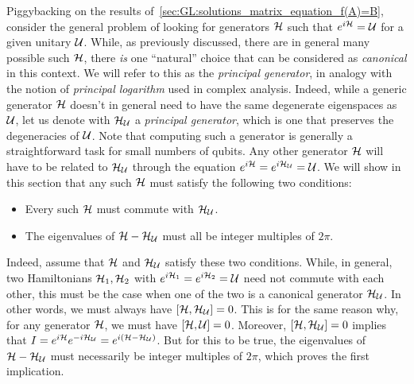 Piggybacking on the results of~\cref{sec:GL:solutions_matrix_equation_f(A)=B}, consider the general problem of looking for generators ${\mathcal{H}}$ such that $e^{i{\mathcal{H}}}={\mathcal{U}}$ for a given unitary ${\mathcal{U}}$.
While, as previously discussed, there are in general many possible such ${\mathcal{H}}$, there \textit{is} one ``natural'' choice that can be considered as \emph{canonical} in this context. We will refer to this as the \emph{principal generator}, in analogy with the notion of \emph{principal logarithm} used in complex analysis.
Indeed, while a generic generator ${\mathcal{H}}$ doesn't in general need to have the same degenerate eigenspaces as ${\mathcal{U}}$, let us denote with ${\mathcal{H}}_{{\mathcal{U}}}$ a \textit{principal generator}, which is one that preserves the degeneracies of ${\mathcal{U}}$.
Note that computing such a generator is generally a straightforward task for small numbers of qubits.
Any other generator ${\mathcal{H}}$ will have to be related to ${\mathcal{H}}_{{\mathcal{U}}}$ through the equation $e^{i{\mathcal{H}}}=e^{i{\mathcal{H}}_{{\mathcal{U}}}}={\mathcal{U}}$.
We will show in this section that any such ${\mathcal{H}}$ must satisfy the following two conditions:
\begin{itemize}
    \item Every such ${\mathcal{H}}$ must commute with ${\mathcal{H}}_{{\mathcal{U}}}$.
    \item The eigenvalues of ${\mathcal{H}}-{\mathcal{H}}_{{\mathcal{U}}}$ must all be integer multiples of $2\pi$.
\end{itemize}

Indeed, assume that ${\mathcal{H}}$ and ${\mathcal{H}}_{{\mathcal{U}}}$ satisfy these two conditions.
While, in general, two Hamiltonians ${\mathcal{H}}_1,{\mathcal{H}}_2$ with $e^{i{\mathcal{H}}_1}=e^{i{\mathcal{H}}_2}={\mathcal{U}}$ need not commute with each other, this must be the case when one of the two is a canonical generator ${\mathcal{H}}_{{\mathcal{U}}}$. In other words, we must always have $[{\mathcal{H}},{\mathcal{H}}_{{\mathcal{U}}}]=0$.
This is for the same reason why, for any generator ${\mathcal{H}}$, we must have $[{\mathcal{H}},{\mathcal{U}}]=0$.
Moreover, $[{\mathcal{H}},{\mathcal{H}}_{{\mathcal{U}}}]=0$ implies that
$I=e^{i{\mathcal{H}}}e^{-i{\mathcal{H}}_{{\mathcal{U}}}}=e^{i({\mathcal{H}}-{\mathcal{H}}_{{\mathcal{U}}})}$.
But for this to be true, the eigenvalues of ${\mathcal{H}}-{\mathcal{H}}_{{\mathcal{U}}}$ must necessarily be integer multiples of $2\pi$, which proves the first implication.

